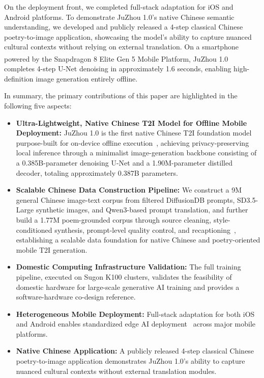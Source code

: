 On the deployment front, we completed full-stack adaptation for iOS and Android platforms. To demonstrate JuZhou 1.0's native Chinese semantic understanding, we developed and publicly released a 4-step classical Chinese poetry-to-image application, showcasing the model's ability to capture nuanced cultural contexts without relying on external translation. On a smartphone powered by the Snapdragon\textsuperscript{\textregistered} 8 Elite Gen 5 Mobile Platform, JuZhou 1.0 completes 4-step U-Net denoising in approximately 1.6 seconds, enabling high-definition image generation entirely offline.

In summary, the primary contributions of this paper are highlighted in the following five aspects:

\begin{itemize}
    \item \textbf{Ultra-Lightweight, Native Chinese T2I Model for Offline Mobile Deployment:} JuZhou 1.0 is the first native Chinese T2I foundation model purpose-built for on-device offline execution~\cite{hu2024snapgen,alibaba2020mnn,qnn}, achieving privacy-preserving local inference through 
    a minimalist image-generation backbone consisting of a 0.385B-parameter denoising U-Net and a 1.90M-parameter distilled decoder, totaling approximately 0.387B parameters.

    \item \textbf{Scalable Chinese Data Construction Pipeline:} We construct a 9M general Chinese image-text corpus from filtered DiffusionDB prompts, SD3.5-Large synthetic images, and Qwen3-based prompt translation, and further build a 1.77M poem-grounded corpus through source cleaning, style-conditioned synthesis, prompt-level quality control, and recaptioning~\cite{schuhmann2022laion,pai2023diffusion,huang2025d2c}, establishing a scalable data foundation for native Chinese and poetry-oriented mobile T2I generation.

    \item \textbf{Domestic Computing Infrastructure Validation:} The full training pipeline, executed on Sugon K100 clusters, validates the feasibility of domestic hardware for large-scale generative AI training and provides a software-hardware co-design reference.

    \item \textbf{Heterogeneous Mobile Deployment:} Full-stack adaptation for both iOS and Android enables standardized edge AI deployment~\cite{alibaba2020mnn,qnn} across major mobile platforms.

    \item \textbf{Native Chinese Application:} A publicly released 4-step classical Chinese poetry-to-image application demonstrates JuZhou 1.0's ability to capture nuanced cultural contexts without external translation modules.
\end{itemize}
